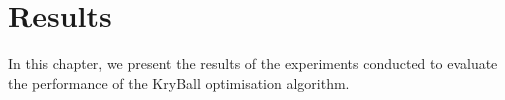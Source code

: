 \chapter{Results}
\label{chap:results}

In this chapter, we present the results of the experiments conducted to evaluate the performance of the KryBall optimisation algorithm.


